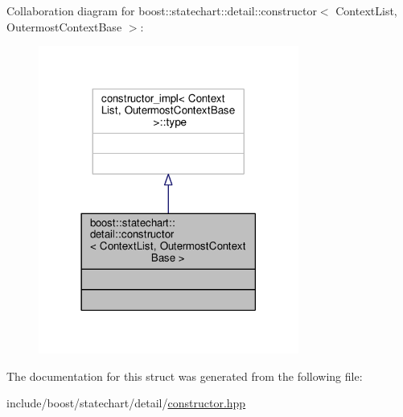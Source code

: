 Collaboration diagram for boost\+:\+:statechart\+:\+:detail\+:\+:constructor$<$ Context\+List, Outermost\+Context\+Base $>$\+:
\nopagebreak
\begin{figure}[H]
\begin{center}
\leavevmode
\includegraphics[width=242pt]{structboost_1_1statechart_1_1detail_1_1constructor__coll__graph}
\end{center}
\end{figure}


The documentation for this struct was generated from the following file\+:\begin{DoxyCompactItemize}
\item 
include/boost/statechart/detail/\mbox{\hyperlink{constructor_8hpp}{constructor.\+hpp}}\end{DoxyCompactItemize}
